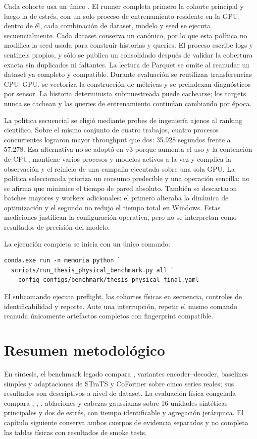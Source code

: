 Cada cohorte usa un único . El runner completa primero la cohorte principal y luego la de estrés, con un solo proceso de entrenamiento residente en la GPU; dentro de él, cada combinación de dataset, modelo y seed se ejecuta secuencialmente. Cada dataset conserva un  canónico, por lo que esta política no modifica la seed usada para construir historias y queries. El proceso escribe logs y sentinels propios, y sólo se publica un consolidado después de validar la cobertura exacta sin duplicados ni faltantes. La lectura de Parquet se omite al reanudar un dataset ya completo y compatible. Durante evaluación se reutilizan transferencias CPU--GPU, se vectoriza la construcción de métricas y se preindexan diagnósticos por sensor. La historia determinista submuestreada puede cachearse; los targets nunca se cachean y las queries de entrenamiento continúan cambiando por época.

La política secuencial se eligió mediante probes de ingeniería ajenos al ranking científico. Sobre el mismo conjunto de cuatro trabajos, cuatro procesos concurrentes lograron mayor throughput que dos: 35.928 segundos frente a 57.278. Esa alternativa no se adoptó en v3 porque aumenta el uso y la contención de CPU, mantiene varios procesos y modelos activos a la vez y complica la observación y el reinicio de una campaña ejecutada sobre una sola GPU. La política seleccionada prioriza un consumo predecible y una operación sencilla; no se afirma que minimice el tiempo de pared absoluto. También se descartaron batches mayores y workers adicionales: el primero alteraba la dinámica de optimización y el segundo no redujo el tiempo total en Windows. Estas mediciones justifican la configuración operativa, pero no se interpretan como resultados de precisión del modelo.

La ejecución completa se inicia con un único comando:
\begin{verbatim}
conda.exe run -n memoria python `
  scripts/run_thesis_physical_benchmark.py all `
  --config configs/benchmark/thesis_physical_final.yaml
\end{verbatim}

El subcomando  ejecuta preflight, las cohortes físicas en secuencia, controles de identificabilidad y reporte. Ante una interrupción, repetir el mismo comando reanuda únicamente artefactos completos con fingerprint compatible.

\section{Resumen metodológico}
\label{sec:resumen-metodologico}

En síntesis, el benchmark legado compara \CTTransformer, variantes encoder--decoder, baselines simples y adaptaciones de STraTS y CoFormer sobre cinco series reales; sus resultados son descriptivos a nivel de dataset. La evaluación física congelada compara \QueryCross, \ContinuousBasis, \CTSSM, ablaciones y cabezas gaussianas sobre 16 unidades sintéticas principales y dos de estrés, con tiempo identificable y agregación jerárquica. El capítulo siguiente conserva ambos cuerpos de evidencia separados y no completa las tablas físicas con resultados de smoke tests.

